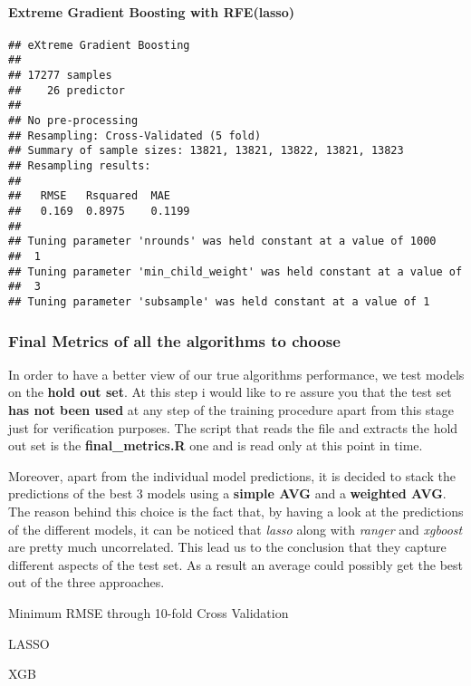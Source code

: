\documentclass[]{article}
\let\oldparagraph\paragraph
\renewcommand{\paragraph}[1]{\oldparagraph{#1}\mbox{}}
\begin{document}
\hypertarget{extreme-gradient-boosting-with-rfelasso}{%
\paragraph{Extreme Gradient Boosting with
RFE(lasso)}\label{extreme-gradient-boosting-with-rfelasso}}

\begin{verbatim}
## eXtreme Gradient Boosting 
## 
## 17277 samples
##    26 predictor
## 
## No pre-processing
## Resampling: Cross-Validated (5 fold) 
## Summary of sample sizes: 13821, 13821, 13822, 13821, 13823 
## Resampling results:
## 
##   RMSE   Rsquared  MAE   
##   0.169  0.8975    0.1199
## 
## Tuning parameter 'nrounds' was held constant at a value of 1000
##  1
## Tuning parameter 'min_child_weight' was held constant at a value of
##  3
## Tuning parameter 'subsample' was held constant at a value of 1
\end{verbatim}

\hypertarget{final-metrics-of-all-the-algorithms-to-choose}{%
\subsubsection{Final Metrics of all the algorithms to
choose}\label{final-metrics-of-all-the-algorithms-to-choose}}

In order to have a better view of our true algorithms performance, we
test models on the \textbf{hold out set}. At this step i would like to
re assure you that the test set \textbf{has not been used} at any step
of the training procedure apart from this stage just for verification
purposes. The script that reads the file and extracts the hold out set
is the \textbf{final\_metrics.R} one and is read only at this point in
time.

Moreover, apart from the individual model predictions, it is decided to
stack the predictions of the best 3 models using a \textbf{simple AVG}
and a \textbf{weighted AVG}. The reason behind this choice is the fact
that, by having a look at the predictions of the different models, it
can be noticed that \emph{lasso} along with \emph{ranger} and
\emph{xgboost} are pretty much uncorrelated. This lead us to the
conclusion that they capture different aspects of the test set. As a
result an average could possibly get the best out of the three
approaches.

Minimum RMSE through 10-fold Cross Validation

LASSO

XGB
\end{document}
